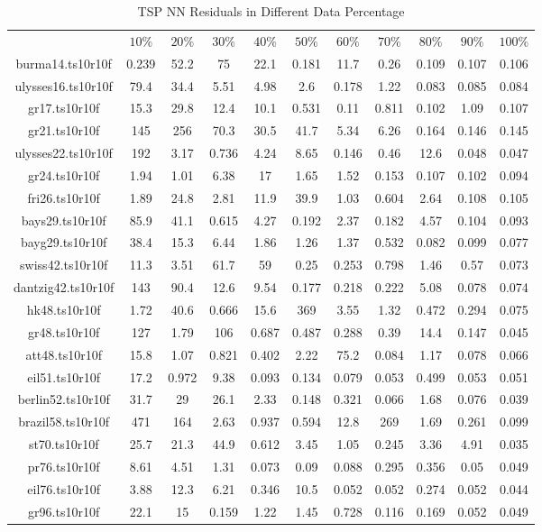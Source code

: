 \begin{table}[htbp]
\caption{TSP NN Residuals in Different Data Percentage}
\centering
\begin{tabular}{|ccccccccccc|}
\hline
 & $10\%$ & $20\%$ & $30\%$ & $40\%$ & $50\%$ & $60\%$ & $70\%$ & $80\%$ & $90\%$ & $100\%$ \\
burma14.ts10r10f & 0.239 & 52.2 &   75 & 22.1 & 0.181 & 11.7 & 0.26 & 0.109 & 0.107 & 0.106 \\
ulysses16.ts10r10f & 79.4 & 34.4 & 5.51 & 4.98 &  2.6 & 0.178 & 1.22 & 0.083 & 0.085 & 0.084 \\
gr17.ts10r10f & 15.3 & 29.8 & 12.4 & 10.1 & 0.531 & 0.11 & 0.811 & 0.102 & 1.09 & 0.107 \\
gr21.ts10r10f &  145 &  256 & 70.3 & 30.5 & 41.7 & 5.34 & 6.26 & 0.164 & 0.146 & 0.145 \\
ulysses22.ts10r10f &  192 & 3.17 & 0.736 & 4.24 & 8.65 & 0.146 & 0.46 & 12.6 & 0.048 & 0.047 \\
gr24.ts10r10f & 1.94 & 1.01 & 6.38 &   17 & 1.65 & 1.52 & 0.153 & 0.107 & 0.102 & 0.094 \\
fri26.ts10r10f & 1.89 & 24.8 & 2.81 & 11.9 & 39.9 & 1.03 & 0.604 & 2.64 & 0.108 & 0.105 \\
bays29.ts10r10f & 85.9 & 41.1 & 0.615 & 4.27 & 0.192 & 2.37 & 0.182 & 4.57 & 0.104 & 0.093 \\
bayg29.ts10r10f & 38.4 & 15.3 & 6.44 & 1.86 & 1.26 & 1.37 & 0.532 & 0.082 & 0.099 & 0.077 \\
swiss42.ts10r10f & 11.3 & 3.51 & 61.7 &   59 & 0.25 & 0.253 & 0.798 & 1.46 & 0.57 & 0.073 \\
dantzig42.ts10r10f &  143 & 90.4 & 12.6 & 9.54 & 0.177 & 0.218 & 0.222 & 5.08 & 0.078 & 0.074 \\
hk48.ts10r10f & 1.72 & 40.6 & 0.666 & 15.6 &  369 & 3.55 & 1.32 & 0.472 & 0.294 & 0.075 \\
gr48.ts10r10f &  127 & 1.79 &  106 & 0.687 & 0.487 & 0.288 & 0.39 & 14.4 & 0.147 & 0.045 \\
att48.ts10r10f & 15.8 & 1.07 & 0.821 & 0.402 & 2.22 & 75.2 & 0.084 & 1.17 & 0.078 & 0.066 \\
eil51.ts10r10f & 17.2 & 0.972 & 9.38 & 0.093 & 0.134 & 0.079 & 0.053 & 0.499 & 0.053 & 0.051 \\
berlin52.ts10r10f & 31.7 &   29 & 26.1 & 2.33 & 0.148 & 0.321 & 0.066 & 1.68 & 0.076 & 0.039 \\
brazil58.ts10r10f &  471 &  164 & 2.63 & 0.937 & 0.594 & 12.8 &  269 & 1.69 & 0.261 & 0.099 \\
st70.ts10r10f & 25.7 & 21.3 & 44.9 & 0.612 & 3.45 & 1.05 & 0.245 & 3.36 & 4.91 & 0.035 \\
pr76.ts10r10f & 8.61 & 4.51 & 1.31 & 0.073 & 0.09 & 0.088 & 0.295 & 0.356 & 0.05 & 0.049 \\
eil76.ts10r10f & 3.88 & 12.3 & 6.21 & 0.346 & 10.5 & 0.052 & 0.052 & 0.274 & 0.052 & 0.044 \\
gr96.ts10r10f & 22.1 &   15 & 0.159 & 1.22 & 1.45 & 0.728 & 0.116 & 0.169 & 0.052 & 0.049 \\
\hline
\end{tabular}
\end{table}
